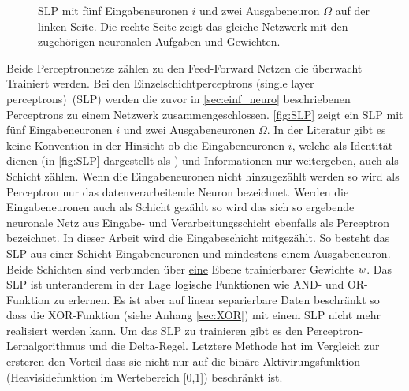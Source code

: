 \begin{figure}[!htb]
    \caption{SLP mit fünf Eingabeneuronen $i$ und zwei Ausgabeneuron $\Omega$ auf der linken Seite. Die rechte Seite zeigt das gleiche Netzwerk mit den zugehörigen neuronalen Aufgaben und Gewichten.}
    \label{fig:SLP}
\end{figure}
Beide Perceptronnetze zählen zu den Feed-Forward Netzen die überwacht Trainiert werden. Bei den Einzelschichtperceptrons (single layer perceptrons)~(SLP) werden die zuvor in \autoref{sec:einf_neuro} beschriebenen Perceptrons zu einem Netzwerk zusammengeschlossen. \autoref{fig:SLP} zeigt ein SLP mit fünf Eingabeneuronen $i$ und zwei Ausgabeneuronen $\Omega$. In der Literatur gibt es keine Konvention in der Hinsicht ob die Eingabeneuronen $i$, welche als Identität dienen (in \autoref{fig:SLP} dargestellt als ) und Informationen nur weitergeben, auch als Schicht zählen. Wenn die Eingabeneuronen nicht hinzugezählt werden so wird als Perceptron nur das datenverarbeitende Neuron  bezeichnet. Werden die Eingabeneuronen auch als Schicht gezählt so wird das sich so ergebende neuronale Netz aus Eingabe- und Verarbeitungsschicht ebenfalls als Perceptron bezeichnet. In dieser Arbeit wird die Eingabeschicht mitgezählt. So besteht das SLP aus einer Schicht Eingabeneuronen und mindestens einem Ausgabeneuron. Beide Schichten sind verbunden über \underline{eine} Ebene trainierbarer Gewichte $\text{\textit{w}}$. Das SLP ist unteranderem in der Lage logische Funktionen wie AND- und OR-Funktion zu erlernen. Es ist aber auf linear separierbare Daten beschränkt so dass die XOR-Funktion (siehe Anhang \ref{sec:XOR}) mit einem SLP nicht mehr realisiert werden kann.
Um das SLP zu trainieren gibt es den Perceptron-Lernalgorithmus und die Delta-Regel. Letztere Methode hat im Vergleich zur ersteren den Vorteil dass sie nicht nur auf die binäre Aktivirungsfunktion (Heavisidefunktion im Wertebereich [0,1]) beschränkt ist.
\\

